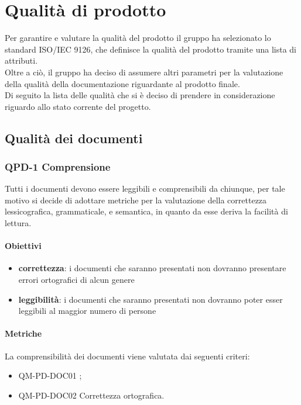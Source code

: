 \section{Qualità di prodotto}
	Per garantire e valutare la qualità del prodotto il gruppo ha selezionato lo standard ISO/IEC 9126, che definisce la qualità del prodotto tramite una lista di attributi.\\
	Oltre a ciò, il gruppo ha deciso di assumere altri parametri per la valutazione della qualità della documentazione riguardante al prodotto finale.\\
	Di seguito la lista delle qualità che si è deciso di prendere in considerazione riguardo allo stato corrente del progetto.\\	
	\subsection{Qualità dei documenti}
	\subsubsection{QPD-1 Comprensione}
		Tutti i documenti devono essere leggibili e comprensibili da chiunque, per tale motivo si decide di adottare metriche per la valutazione della correttezza lessicografica, grammaticale, e semantica, in quanto da esse deriva la facilità di lettura.
		
	\paragraph{Obiettivi}
		\begin{itemize}
			\item \textbf{correttezza}: i documenti che saranno presentati non dovranno presentare errori ortografici di alcun genere
			\item \textbf{leggibilità}: i documenti che saranno presentati non dovranno poter esser leggibili al maggior numero di persone
		\end{itemize}
		
		
	\paragraph{Metriche}
	La comprensibilità dei documenti viene valutata dai seguenti criteri:
	\begin{itemize}
		\item QM-PD-DOC01 ;
     		\item QM-PD-DOC02 Correttezza ortografica.
	\end{itemize}
